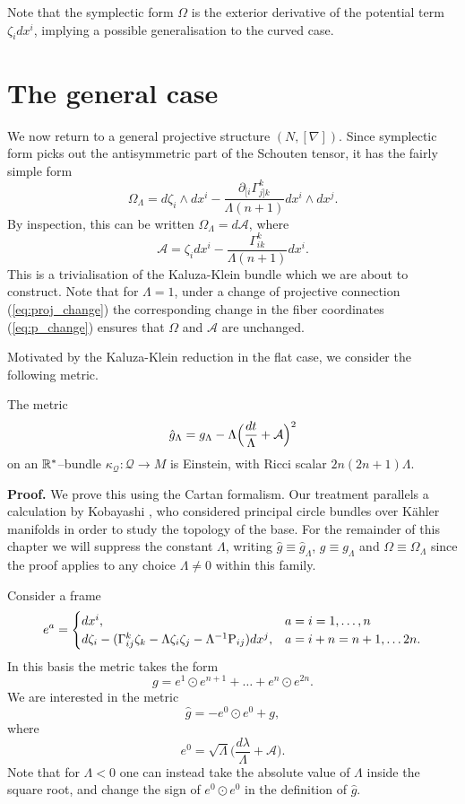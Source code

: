 Note that the symplectic form $\Omega$ is the exterior derivative
of the potential term $\zeta_{i} dx^{i}$, implying a possible
generalisation to the curved case.


\section{The general case}

We now return to a general projective structure $(N,[\nabla])$. Since
symplectic form picks out the antisymmetric part of the Schouten tensor,
it has the fairly simple form
\[
\Omega_{\Lambda}= d\zeta_{i}\wedge dx^{i}-\frac{\partial_{[i}\Gamma_{j]k}^{k}}{\Lambda(n+1)} dx^{i}\wedge dx^{j}.
\]
By inspection, this can be written $\Omega_{\Lambda}=d\mathcal{A}$,
where
\[
\mathcal{A}=\zeta_{i} dx^{i}-\frac{\Gamma_{ik}^{k}}{\Lambda(n+1)} dx^{i}.
\]
This is a trivialisation of the Kaluza-Klein bundle which we are about
to construct. Note that for $\Lambda=1$, under a change of projective
connection (\ref{eq:proj_change}) the corresponding change in the
fiber coordinates (\ref{eq:p_change}) ensures that $\Omega$ and
$\mathcal{A}$ are unchanged.

Motivated by the Kaluza-Klein reduction in the flat case, we consider
the following metric.
\begin{theo}
The metric
\begin{equation}
\hat{g}_{\Lambda}=g_{\Lambda}-\Lambda\Bigl(\frac{ dt}{\Lambda}+\mathcal{A}\Bigr)^{2}\label{eq:G}
\end{equation}
on an $\mathbb{R}^*$--bundle $\kappa_\mathcal{Q}:\mathcal{Q}\rightarrow M$ is Einstein,
with Ricci scalar $2n(2n+1)\Lambda$.
\end{theo}
\textbf{Proof.} We prove this using the Cartan formalism. Our treatment
parallels a calculation by Kobayashi \cite{Kob}, who considered
principal circle bundles over K\"ahler manifolds in order to study the
topology of the base. For the remainder of this chapter we will suppress the constant $\Lambda$, writing $\hat{g}\equiv\hat{g}_{\Lambda}$, $g\equiv g_{\Lambda}$ and $\Omega\equiv\Omega_\Lambda$ since the proof applies to any choice $\Lambda\neq0$ within this family.

Consider a frame
\begin{equation}
e^{a}=\begin{cases}
 dx^{i}, & a=i=1,\dots,n\\
 d\zeta_{i}-(\Gamma_{ij}^{k}\zeta_{k}-\Lambda \zeta_{i}\zeta_{j}-\Lambda^{-1}\mathrm{P}_{ij}) dx^{j}, & a=i+n=n+1,\dots2n.
\end{cases}\label{eq:basis}
\end{equation}
In this basis the metric takes the form
\begin{equation}
g=e^{1}\odot e^{n+1}+\dots+e^{n}\odot e^{2n}.\label{eq:g_cov_const}
\end{equation}
We are interested in the metric
\[
\hat{g}=-e^{0}\odot e^{0}+g,
\]
where
\[
e^{0}=\sqrt{\Lambda}\biggl(\frac{ d\lambda}{\Lambda}+\mathcal{A}\biggr).
\]
Note that for $\Lambda<0$ one can instead take the absolute value of $\Lambda$ inside the square root, and change the sign of $e^{0}\odot e^{0}$ in the definition of $\hat{g}$.

